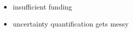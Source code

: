 \documentclass[hide notes,intlimits]{beamer}
\begin{document}
\begin{frame}
\begin{columns}[c]
\begin{column}{.2\linewidth}
\begin{figure}
      \end{figure}
    \end{column}
    \begin{column}{.7\linewidth}
      \begin{itemize}
      \item insufficient funding
      \item uncertainty quantification gets messy
      \end{itemize}
    \end{column}
  \end{columns}
\end{frame}
  
  {
}

\begin{frame}{}
\end{frame}
\end{document}
